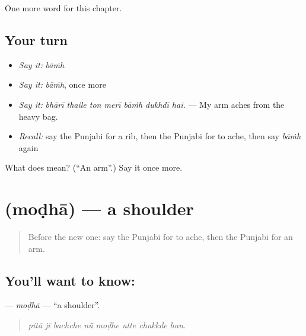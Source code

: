 \begin{grammarlens}[title={What you've built}]
One more word for this chapter.
\end{grammarlens}

\subsection*{Your turn}
\begin{itemize}
\raggedright
  \item \emph{Say it:} \emph{bāṁh}
  \item \emph{Say it:} \emph{bāṁh}, once more
  \item \emph{Say it:} \emph{bhārī thaile ton merī bāṁh dukhdī hai.} — My arm aches from the heavy bag.
  \item \emph{Recall:} say the Punjabi for a rib, then the Punjabi for to ache, then say \emph{bāṁh} again
\end{itemize}

\begin{tcolorbox}[breakable,colback=teal!4,colframe=teal!35!black,title={Before you move on}]
What does  mean? (\textquotedblleft{}An arm\textquotedblright{}.) Say it once more.
\end{tcolorbox}
\section[\texorpdfstring{\pa{ਮੋਢਾ} (moḍhā)}{ਮੋਢਾ (moḍhā)}]{ (moḍhā) — a shoulder}

\label{lesson:PA-C324-modha}



\begin{quote}
Before the new one: say the Punjabi for to ache, then the Punjabi for an arm.
\end{quote}

\subsection*{You'll want to know: }
\textbf{} — \emph{moḍhā} — \textquotedblleft{}a shoulder\textquotedblright{}.

\begin{quote}
       
\end{quote}

\begin{quote}
\emph{pitā jī bachche nū̃ moḍhe utte chukkde han.}
\end{quote}

